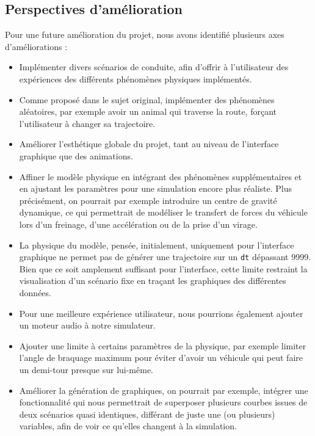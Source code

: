 \subsection{Perspectives d'amélioration}\label{subsec:perspectives-d'ameliorations}
Pour une future amélioration du projet, nous avons identifié plusieurs axes d'améliorations :
\begin{itemize}
    \item Implémenter divers scénarios de conduite, afin d'offrir à l'utilisateur des expériences des différents phénomènes physiques implémentés.
    \item Comme proposé dans le sujet original, implémenter des phénomènes aléatoires, par exemple avoir un animal qui traverse la route, forçant l'utilisateur à changer sa trajectoire.
    \item Améliorer l'esthétique globale du projet, tant au niveau de l'interface graphique que des animations.
    \item Affiner le modèle physique en intégrant des phénomènes supplémentaires et en ajustant les paramètres pour une simulation encore plus réaliste.
    Plus précisément, on pourrait par exemple introduire un centre de gravité dynamique, ce qui permettrait de modéliser le transfert de forces du véhicule lors d'un freinage, d'une accélération ou de la prise d'un virage.
    \item La physique du modèle, pensée, initialement, uniquement pour l'interface graphique ne permet pas de générer une trajectoire sur un \texttt{dt} dépassant 9999.
    Bien que ce soit amplement suffisant pour l'interface, cette limite restraint la visualisation d'un scénario fixe en traçant les graphiques des différentes données.
    \item Pour une meilleure expérience utilisateur, nous pourrions également ajouter un moteur audio à notre simulateur.
    \item Ajouter une limite à certains paramètres de la physique, par exemple limiter l'angle de braquage maximum pour éviter d'avoir un véhicule qui peut faire un demi-tour presque sur lui-même.
    \item Améliorer la génération de graphiques, on pourrait par exemple, intégrer une fonctionnalité qui nous permettrait de superposer plusieurs courbes issues de deux scénarios quasi identiques, différant de juste une (ou plusieurs) variables, afin de voir ce qu'elles changent à la simulation.

\end{itemize}

